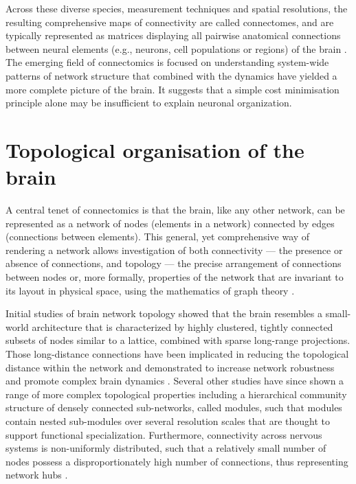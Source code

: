 Across these diverse species, measurement techniques and spatial resolutions, the resulting comprehensive maps of connectivity are called connectomes, and are typically represented as matrices displaying all pairwise anatomical connections between neural elements (e.g., neurons, cell populations or regions) of the brain \citep{Sporns2005}. The emerging field of connectomics is focused on understanding system-wide patterns of network structure that combined with the dynamics have yielded a more complete picture of the brain. It suggests that a simple cost minimisation principle alone may be insufficient to explain neuronal organization.

\section{Topological organisation of the brain}

A central tenet of connectomics is that the brain, like any other network, can be represented as a network of nodes (elements in a network) connected by edges (connections between elements). This general, yet comprehensive way of rendering a network allows investigation of both connectivity --- the presence or absence of connections, and topology --- the precise arrangement of connections between nodes or, more formally, properties of the network that are invariant to its layout in physical space, using the mathematics of graph theory \citep{Barabasi2016}.

Initial studies of brain network topology showed that the brain resembles a small-world architecture \citep{Bassett2006,Gygi1999,Hilgetag2004,Sporns2004,Watts1998} that is characterized by highly clustered, tightly connected subsets of nodes similar to a lattice, combined with sparse long-range projections. Those long-distance connections have been implicated in reducing the topological distance within the network \citep{Bullmore2012,Sporns2004,VandenHeuvel2011} and demonstrated to increase network robustness and promote complex brain dynamics \citep{Betzel2018}. Several other studies have since shown a range of more complex topological properties including a hierarchical community structure of densely connected sub-networks, called modules, such that modules contain nested sub-modules over several resolution scales \citep{Bullmore1997,Meunier2010a,Towlson2013} that are thought to support functional specialization. Furthermore, connectivity across nervous systems is non-uniformly distributed, such that a relatively small number of nodes possess a disproportionately high number of connections, thus representing network hubs \citep{Towlson2013,VandenHeuvel2011}.

